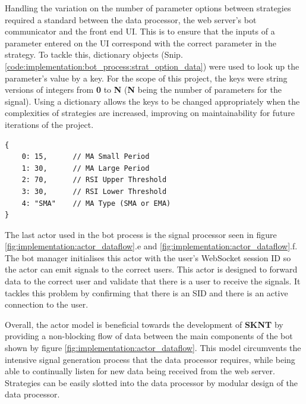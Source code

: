 Handling the variation on the number of parameter options between strategies required a standard between the data processor, the web server's bot communicator and the front end UI. This is to ensure that the inputs of a parameter entered on the UI correspond with the correct parameter in the strategy. To tackle this, dictionary objects (Snip. \ref{code:implementation:bot_process:strat_option_data}) were used to look up the parameter's value by a key. For the scope of this project, the keys were string versions of integers from \textbf{0} to \textbf{N} (\textbf{N} being the number of parameters for the signal). Using a dictionary allows the keys to be changed appropriately when the complexities of strategies are increased, improving on maintainability for future iterations of the project.

\begin{listing}
\caption{Default configuration data for the "MA Crossover \& RSI" strategy} 
\label{code:implementation:bot_process:strat_option_data}
\begin{verbatim}
{   
    0: 15,      // MA Small Period
    1: 30,      // MA Large Period
    2: 70,      // RSI Upper Threshold
    3: 30,      // RSI Lower Threshold
    4: "SMA"    // MA Type (SMA or EMA)
}
\end{verbatim}
\end{listing}

The last actor used in the bot process is the signal processor seen in figure \ref{fig:implementation:actor_dataflow}.e and \ref{fig:implementation:actor_dataflow}.f. The bot manager initialises this actor with the user's WebSocket session ID so the actor can emit signals to the correct users. This actor is designed to forward data to the correct user and validate that there is a user to receive the signals. It tackles this problem by confirming that there is an SID and there is an active connection to the user. 

Overall, the actor model is beneficial towards the development of \textbf{SKNT} by providing a non-blocking flow of data between the main components of the bot shown by figure \ref{fig:implementation:actor_dataflow}. This model circumvents the intensive signal generation process that the data processor requires, while being able to continually listen for new data being received from the web server. Strategies can be easily slotted into the data processor by modular design of the data processor. 



